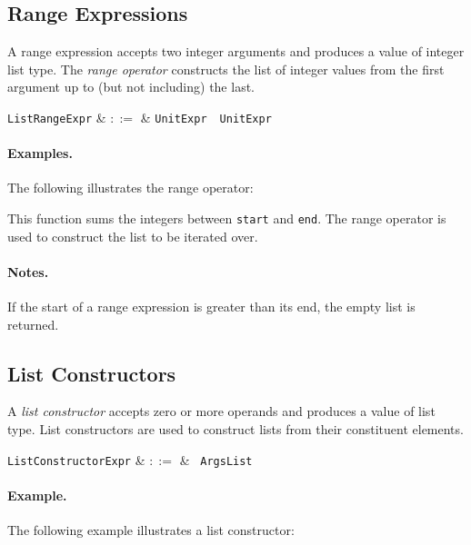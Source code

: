 \subsection{Range Expressions}
\label{c_expr_range}

A range expression accepts two integer arguments and produces a value of integer list type.  The {\em range operator} constructs the list of integer values from the first argument up to (but not including) the last.

\begin{syntax}
  \verb+ListRangeExpr+ & $::=$ & \verb+UnitExpr+\ \ \verb+UnitExpr+\\
\end{syntax}

\paragraph{Examples.}  The following illustrates the range operator:



This function sums the integers between \lstinline{start} and \lstinline{end}.  The range operator is used to construct the list to be iterated over.

\paragraph{Notes.}  If the start of a range expression is greater than its end, the empty list is returned.


\subsection{List Constructors}
\label{c_expr_list_constructor}
A {\em list constructor} accepts zero or more operands and produces a value of list type.  List constructors are used to construct lists from their constituent elements.  

\begin{syntax}
  \verb+ListConstructorExpr+ & $::=$ & \token{[}\ \verb+ArgsList+ \token{]}\\
\end{syntax}

\paragraph{Example.}  The following example illustrates a list constructor:

